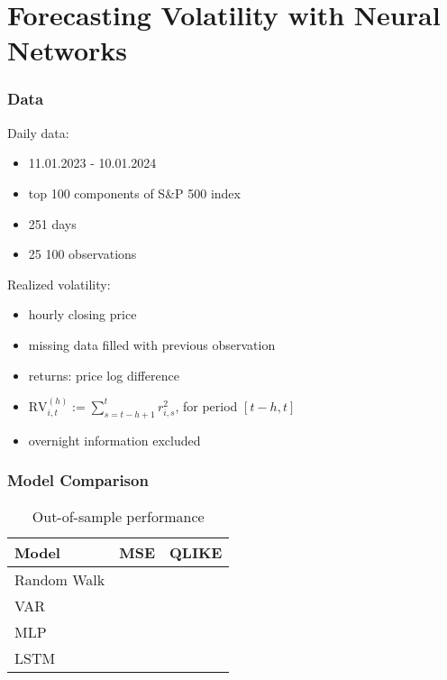 \documentclass[handout]{beamer}
\begin{document}
\section{Forecasting Volatility with Neural Networks}

\begin{frame}
\label{data}
\frametitle{Data}
Daily data:
\begin{itemize}
    \item 11.01.2023 - 10.01.2024
    \item top 100 components of S\&P 500 index \\ 
    \hyperlink{sector}{}
    \item 251 days
    \item 25 100 observations
\end{itemize}
\vspace{5mm}
Realized volatility:
\begin{itemize}
    \item hourly closing price
    \item missing data filled with previous observation
    \item returns: price log difference
    \item $\mathrm{RV}_{i, t}^{(h)}:=  \displaystyle\sum_{s=t-h+1}^t r_{i, s}^2 $, for period  $[t-h, t]$
    \item overnight information excluded
    
\end{itemize}
\end{frame}

\begin{frame}
\frametitle{Model Comparison}

\begin{table}
\caption{\label{table01}Out-of-sample performance}
\begin{tabular}{|lll|}
\hline \hline 
Model  \hspace{20mm} &  MSE \hspace{5mm} & QLIKE \\ 
\hline \hline 
Random Walk & & \\
VAR & & \\
MLP & & \\
LSTM & & \\
\hline

\end{tabular}
\end{table}

\end{frame}
\end{document}
